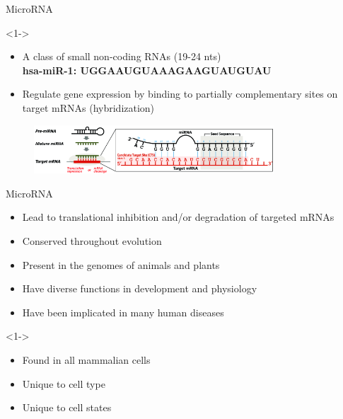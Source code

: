 \documentclass{beamer}
\begin{document}
\begin{frame}{MicroRNA}
	\begin{exampleblock}
		<1->{}
		\begin{itemize}
			\item A class of small non-coding RNAs (19-24 nts)\\
			      \textbf{hsa-miR-1: UGGAAUGUAAAGAAGUAUGUAU
			      	}\item Regulate gene expression by binding to partially complementary sites
			      on target mRNAs (hybridization)
		\end{itemize}
	\end{exampleblock}
	\begin{figure}[ht!]
		\centering
			\includegraphics[width=0.8\textwidth]{images/mirna-target.png}
		\end{figure}
\end{frame}


\begin{frame}{MicroRNA}
	\begin{itemize}
\item Lead to translational inhibition and/or degradation of targeted mRNAs
\item Conserved throughout evolution
\item Present in the genomes of animals and plants  
\item Have diverse functions in development and physiology
\item Have been implicated in many human diseases
\end{itemize}
	\begin{exampleblock}
		<1->{}
		\begin{itemize}
			\item Found in all mammalian cells
			\item Unique to cell type
			\item Unique to cell states
		\end{itemize}
	\end{exampleblock}

\end{frame}
\end{document}
